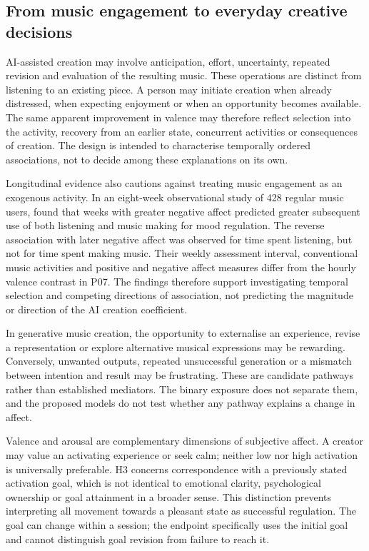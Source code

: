 \documentclass[11pt]{article}
\begin{document}
\subsection{From music engagement to everyday creative decisions}
AI-assisted creation may involve anticipation, effort, uncertainty, repeated revision and evaluation of the resulting music. These operations are distinct from listening to an existing piece. A person may initiate creation when already distressed, when expecting enjoyment or when an opportunity becomes available. The same apparent improvement in valence may therefore reflect selection into the activity, recovery from an earlier state, concurrent activities or consequences of creation. The design is intended to characterise temporally ordered associations, not to decide among these explanations on its own.

Longitudinal evidence also cautions against treating music engagement as an exogenous activity. In an eight-week observational study of 428 regular music users, \citet{koehler2024} found that weeks with greater negative affect predicted greater subsequent use of both listening and music making for mood regulation. The reverse association with later negative affect was observed for time spent listening, but not for time spent making music. Their weekly assessment interval, conventional music activities and positive and negative affect measures differ from the hourly valence contrast in P07. The findings therefore support investigating temporal selection and competing directions of association, not predicting the magnitude or direction of the AI creation coefficient.

In generative music creation, the opportunity to externalise an experience, revise a representation or explore alternative musical expressions may be rewarding. Conversely, unwanted outputs, repeated unsuccessful generation or a mismatch between intention and result may be frustrating. These are candidate pathways rather than established mediators. The binary exposure does not separate them, and the proposed models do not test whether any pathway explains a change in affect.

Valence and arousal are complementary dimensions of subjective affect. A creator may value an activating experience or seek calm; neither low nor high activation is universally preferable. H3 concerns correspondence with a previously stated activation goal, which is not identical to emotional clarity, psychological ownership or goal attainment in a broader sense. This distinction prevents interpreting all movement towards a pleasant state as successful regulation. The goal can change within a session; the endpoint specifically uses the initial goal and cannot distinguish goal revision from failure to reach it.
\end{document}
